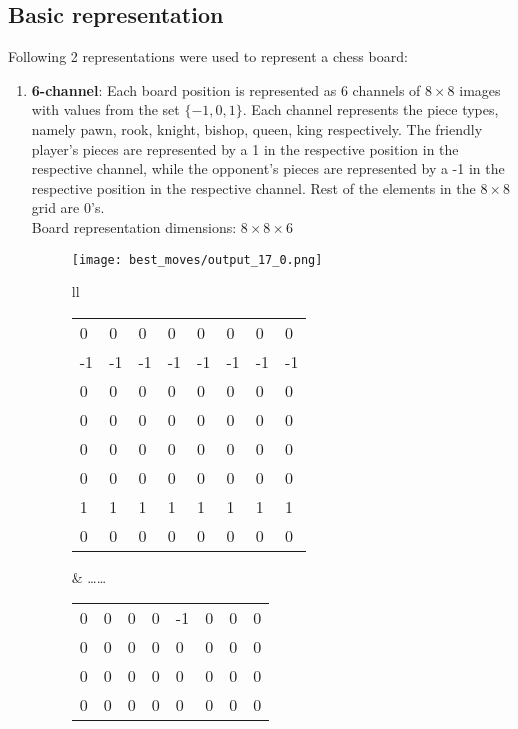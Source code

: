 \subsection{Basic representation}
Following 2 representations were used to represent a chess board:
\begin{enumerate}
\item\textbf{6-channel}: Each board position is represented as 6 channels of 
$8\times 8$ images with values from the set $\{-1,0,1\}$. Each channel 
represents the piece types, namely pawn, rook, knight, bishop, queen, king 
respectively. The friendly player's pieces are represented by a 1 in the 
respective position in the respective channel, while the opponent's pieces are 
represented by a -1 in the respective position in the respective channel. Rest 
of the elements in the $8\times 8$ grid are 0's.\\
Board representation dimensions: $8\times 8 \times 6$\\
\begin{figure}[H]
\centering
\texttt{[image: best\_moves/output\_17\_0.png]}
\begin{longtable}[width=\textwidth]{ll}
\small
   \begin{tabular}[width=0.33\textwidth]{|llllllll|}
    \hline
    0  & 0  & 0  & 0  & 0  & 0  & 0  & 0  \\
    -1 & -1 & -1 & -1 & -1 & -1 & -1 & -1 \\
    0  & 0  & 0  & 0  & 0  & 0  & 0  & 0  \\
    0  & 0  & 0  & 0  & 0  & 0  & 0  & 0  \\
    0  & 0  & 0  & 0  & 0  & 0  & 0  & 0  \\
    0  & 0  & 0  & 0  & 0  & 0  & 0  & 0  \\
    1  & 1  & 1  & 1  & 1  & 1  & 1  & 1  \\
    0  & 0  & 0  & 0  & 0  & 0  & 0  & 0  \\ \hline
    \end{tabular}
    &
\dots\dots\hspace{0.2cm}
\small
    \begin{tabular}[width=0.33\textwidth]{|llllllll|}
    \hline
    0  & 0  & 0  & 0  & -1  & 0  & 0  & 0  \\
    0  & 0  & 0  & 0  & 0  & 0  & 0  & 0  \\
    0  & 0  & 0  & 0  & 0  & 0  & 0  & 0  \\
    0  & 0  & 0  & 0  & 0  & 0  & 0  & 0  \\

\end{tabular}
\end{longtable}
\end{figure}
\end{enumerate}
